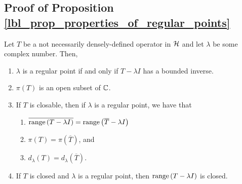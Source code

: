 \subsection{Proof of Proposition \eqref{lbl_prop_properties_of_regular_points}}\label{proof_lbl_prop_properties_of_regular_points}
\begin{proposition}
  Let $T$ be a not necessarily densely-defined operator in $\mathcal{H}$ and let $\lambda$ be some complex number. Then,
  \begin{enumerate}[label = (\alph*)]
    \item $\lambda$ is a regular point if and only if $T - \lambda I$ has a bounded inverse.
    \item $\pi(T)$ is an open subset of $\mathbb{C}$.
    \item If $T$ is closable, then if $\lambda$ is a regular point, we have that
      \begin{enumerate}[label=(\roman*)]
        \item $\overline{\operatorname{range}\left(T - \lambda I\right)} = \operatorname{range}\left(\overline{T} - \lambda I\right)$
        \item $\pi(T) = \pi(\overline{T})$, and
        \item $d_\lambda(T) = d_\lambda (\overline{T})$.
      \end{enumerate}
    \item If $T$ is closed and $\lambda$ is a regular point, then $\operatorname{range}\left(T - \lambda I\right)$ is closed.
  \end{enumerate}
\end{proposition}
